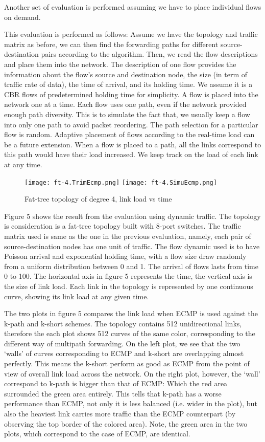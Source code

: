 \documentclass[conference]{IEEEtran}
\begin{document}
Another set of evaluation is performed assuming we have to place individual
flows on demand. 

This evaluation is performed as follows: Assume we have the topology and
traffic matrix as before, we can then find the forwarding paths for different
source-destination pairs according to the algorithm. Then, we read the flow
descriptions and place them into the network. The description of one flow
provides the information about the flow's source and destination node, the size
(in term of traffic rate of data), the time of arrival, and its holding time.
We assume it is a CBR flows of predetermined holding time for simplicity. A
flow is placed into the network one at a time. Each flow uses one path, even if
the network provided enough path diversity. This is to simulate the fact that,
we usually keep a flow into only one path to avoid packet reordering. The path
selection for a particular flow is random. Adaptive placement of flows
according to the real-time load can be a future extension. When a flow is
placed to a path, all the links correspond to this path would have their load
increased. We keep track on the load of each link at any time.

\begin{figure}
\centering\texttt{[image: ft-4.TrimEcmp.png]}
\centering\texttt{[image: ft-4.SimuEcmp.png]}
\caption{Fat-tree topology of degree 4, link load vs time}
\end{figure}

Figure 5 shows the result from the evaluation using dynamic traffic. The
topology is consideration is a fat-tree topology built with 8-port switches.
The traffic matrix used is same as the one in the previous evaluation, namely,
each pair of source-destination nodes has one unit of traffic. The flow dynamic
used is to have Poisson arrival and exponential holding time, with a flow size
draw randomly from a uniform distribution between 0 and 1. The arrival of flows
lasts from time 0 to 100. The horizontal axis in figure 5 represents the time,
the vertical axis is the size of link load. Each link in the topology is
represented by one continuous curve, showing its link load at any given time.

The two plots in figure 5 compares the link load when ECMP is used against the
k-path and k-short schemes. The topology contains 512 unidirectional links,
therefore the each plot shows 512 curves of the same color, corresponding to
the different way of multipath forwarding. On the left plot, we see that the
two `walls' of curves corresponding to ECMP and k-short are overlapping almost
perfectly. This means the k-short perform as good as ECMP from the point of
view of overall link load across the network. On the right plot, however, the
`wall' correspond to k-path is bigger than that of ECMP: Which the red area
surrounded the green area entirely. This tells that k-path has a worse
performance than ECMP, not only it is less balanced (i.e. wider in the plot),
but also the heaviest link carries more traffic than the ECMP counterpart (by
observing the top border of the colored area). Note, the green area in the two
plots, which correspond to the case of ECMP, are identical.
\end{document}
